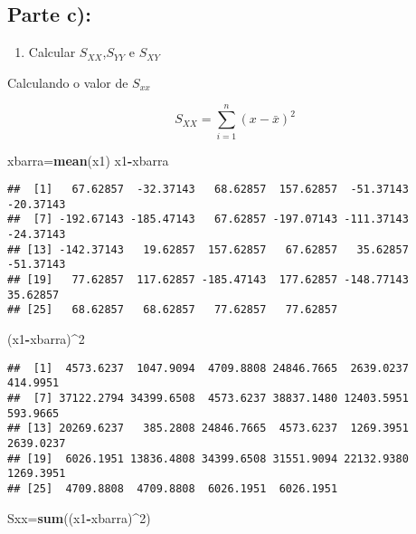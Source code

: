 \documentclass[
]{article}
\newenvironment{Shaded}{\begin{snugshade}}{\end{snugshade}}
\newcommand{\DecValTok}[1]{\textcolor[rgb]{0.00,0.00,0.81}{#1}}
\newcommand{\KeywordTok}[1]{\textcolor[rgb]{0.13,0.29,0.53}{\textbf{#1}}}
\newcommand{\NormalTok}[1]{#1}
\newcommand{\OperatorTok}[1]{\textcolor[rgb]{0.81,0.36,0.00}{\textbf{#1}}}
\providecommand{\tightlist}{%
  \setlength{\itemsep}{0pt}\setlength{\parskip}{0pt}}
\begin{document}
\hypertarget{parte-c}{%
\subsection{\texorpdfstring{Parte
\textbf{c)}:}{Parte c):}}\label{parte-c}}

\begin{enumerate}
\def\labelenumi{\arabic{enumi}.}
\tightlist
\item
  Calcular \(S_{XX}\),\(S_{YY}\) e \(S_{XY}\)
\end{enumerate}

Calculando o valor de \(S_{xx}\)

\[S_{XX} =  \sum_{i=1}^n (x -\bar{x})^2\]

\begin{Shaded}
\begin{Highlighting}[]
\NormalTok{xbarra=}\KeywordTok{mean}\NormalTok{(x1)}
\NormalTok{x1}\OperatorTok{-}\NormalTok{xbarra}
\end{Highlighting}
\end{Shaded}

\begin{verbatim}
##  [1]   67.62857  -32.37143   68.62857  157.62857  -51.37143  -20.37143
##  [7] -192.67143 -185.47143   67.62857 -197.07143 -111.37143  -24.37143
## [13] -142.37143   19.62857  157.62857   67.62857   35.62857  -51.37143
## [19]   77.62857  117.62857 -185.47143  177.62857 -148.77143   35.62857
## [25]   68.62857   68.62857   77.62857   77.62857
\end{verbatim}

\begin{Shaded}
\begin{Highlighting}[]
\NormalTok{(x1}\OperatorTok{-}\NormalTok{xbarra)}\OperatorTok{^}\DecValTok{2}
\end{Highlighting}
\end{Shaded}

\begin{verbatim}
##  [1]  4573.6237  1047.9094  4709.8808 24846.7665  2639.0237   414.9951
##  [7] 37122.2794 34399.6508  4573.6237 38837.1480 12403.5951   593.9665
## [13] 20269.6237   385.2808 24846.7665  4573.6237  1269.3951  2639.0237
## [19]  6026.1951 13836.4808 34399.6508 31551.9094 22132.9380  1269.3951
## [25]  4709.8808  4709.8808  6026.1951  6026.1951
\end{verbatim}

\begin{Shaded}
\begin{Highlighting}[]
\NormalTok{Sxx=}\KeywordTok{sum}\NormalTok{((x1}\OperatorTok{-}\NormalTok{xbarra)}\OperatorTok{^}\DecValTok{2}\NormalTok{)}
\end{Highlighting}
\end{Shaded}
\end{document}
